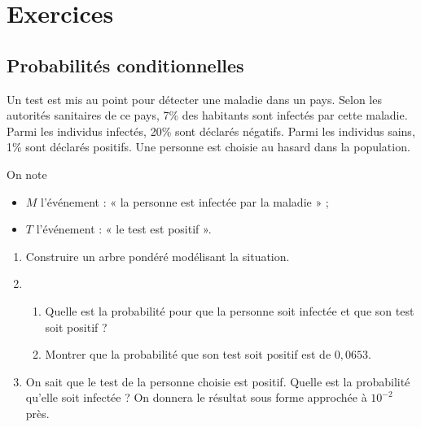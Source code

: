 \documentclass[11pt,fleqn, openany]{book} %
\begin{document}


\chapter{Exercices}

\section*{Probabilités conditionnelles}

\begin{exercise}[subtitle={(Polynésie 2021)}]

Un test est mis au point pour détecter une maladie dans un pays.
Selon les autorités sanitaires de ce pays, 7\% des habitants sont infectés par cette maladie. Parmi les individus infectés, 20\% sont déclarés négatifs.
Parmi les individus sains, 1\% sont déclarés positifs.
Une personne est choisie au hasard dans la population.

On note
\begin{itemize}
\item $M$ l'événement : « la personne est infectée par la maladie » ;
\item $T$ l'événement : « le test est positif ».
\end{itemize}

\begin{enumerate}
\item Construire un arbre pondéré modélisant la situation.
\item \begin{enumerate}
\item Quelle est la probabilité pour que la personne soit infectée et que son test soit positif ?
\item Montrer que la probabilité que son test soit positif est de $0,0653$.
\end{enumerate}
\item On sait que le test de la personne choisie est positif. Quelle est la probabilité qu'elle soit infectée ?
On donnera le résultat sous forme approchée à $10^{-2}$ près.
\end{enumerate}

\end{exercise}
\end{document}
